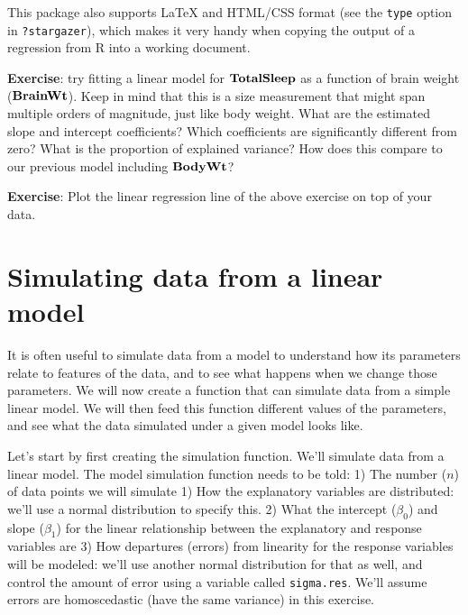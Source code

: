 \documentclass[
]{book}
\begin{document}
This package also supports LaTeX and HTML/CSS format (see the \texttt{type} option in \texttt{?stargazer}), which makes it very handy when copying the output of a regression from R into a working document.

\textbf{Exercise}: try fitting a linear model for \(\bf{TotalSleep}\) as a function of brain weight (\(\bf{BrainWt}\)). Keep in mind that this is a size measurement that might span multiple orders of magnitude, just like body weight. What are the estimated slope and intercept coefficients? Which coefficients are significantly different from zero? What is the proportion of explained variance? How does this compare to our previous model including \(\bf{BodyWt}\)?

\textbf{Exercise}: Plot the linear regression line of the above exercise on top of your data.

\hypertarget{simulating-data-from-a-linear-model}{%
\section{Simulating data from a linear model}\label{simulating-data-from-a-linear-model}}

It is often useful to simulate data from a model to understand how its parameters relate to features of the data, and to see what happens when we change those parameters. We will now create a function that can simulate data from a simple linear model. We will then feed this function different values of the parameters, and see what the data simulated under a given model looks like.

Let's start by first creating the simulation function. We'll simulate data from a linear model. The model simulation function needs to be told:
1) The number (\(n\)) of data points we will simulate
1) How the explanatory variables are distributed: we'll use a normal distribution to specify this.
2) What the intercept (\(\beta_0\)) and slope (\(\beta_1\)) for the linear relationship between the explanatory and response variables are
3) How departures (errors) from linearity for the response variables will be modeled: we'll use another normal distribution for that as well, and control the amount of error using a variable called \texttt{sigma.res}. We'll assume errors are homoscedastic (have the same variance) in this exercise.
\end{document}
